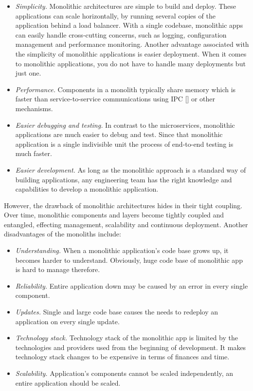 \begin{itemize}
    \item \textit{Simplicity.} Monolithic architectures are simple to build and deploy.
    These applications can scale horizontally, by running several copies of the application behind a load balancer.
    With a single codebase, monolithic apps can easily handle cross-cutting concerns, such as logging,
    configuration management and performance monitoring.
    Another advantage associated with the simplicity of monolithic applications is easier deployment.
    When it comes to monolithic applications, you do not have to handle many deployments but just one.
    \item \textit{Performance.} Components in a monolith typically share memory which is faster than service-to-service
    communications using IPC [\cite{proctor1999linux}] or other mechanisms.
    \item \textit{Easier debugging and testing.}
    In contrast to the microservices, monolithic applications are much easier to debug and test.
    Since that monolithic application is a single indivisible unit the process of end-to-end testing is much faster.
    \item \textit{Easier development.} As long as the monolithic approach is a standard way of building applications,
    any engineering team has the right knowledge and capabilities to develop a monolithic application.
\end{itemize}

However, the drawback of monolithic architectures hides in their tight coupling.
Over time, monolithic components and layers become tightly coupled and entangled, effecting management, scalability
and continuous deployment.
Another disadvantages of the monoliths include:
\begin{itemize}
    \item \textit{Understanding.} When a monolithic application's code base grows up,
    it becomes harder to understand.
    Obviously, huge code base of monolithic app is hard to manage therefore.
    \item \textit{Reliability.} Entire application down may be caused by an error in every single component.
    \item \textit{Updates.} Single and large code base causes the needs to redeploy an application on every single update.
    \item \textit{Technology stack.} Technology stack of the monolithic app is limited by the technologies and providers
    used from the beginning of development.
    It makes technology stack changes to be expensive in terms of finances and time.
    \item \textit{Scalability.} Application's components cannot be scaled independently, an entire application should be scaled.
\end{itemize}

